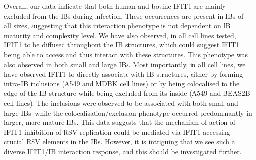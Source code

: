 Overall, our data indicate that both human and bovine IFIT1 are mainly excluded from the IBs during infection. These occurrences are present in IBs of all sizes, suggesting that this interaction phenotype is not dependent on IB maturity and complexity level. We have also observed, in all cell lines tested, IFIT1 to be diffused throughout the IB structures, which could suggest IFIT1 being able to access and thus interact with these structures. This phenotype was also observed in both small and large IBs. Most importantly, in all cell lines, we have observed IFIT1 to directly associate with IB structures, either by forming intra-IB inclusions (A549 and MDBK cell lines) or by being colocalised to the edge of the IB structure while being excluded from its inside (A549 and BEAS2B cell lines). The inclusions were observed to be associated with both small and large IBs, while the colocalisation/exclusion phenotype occurred predominantly in larger, more mature IBs. This data suggests that the mechanism of action of IFIT1 inhibition of RSV replication could be mediated via IFIT1 accessing crucial RSV elements in the IBs. However, it is intriguing that we see such a diverse IFIT1/IB interaction response, and this should be investigated further.

